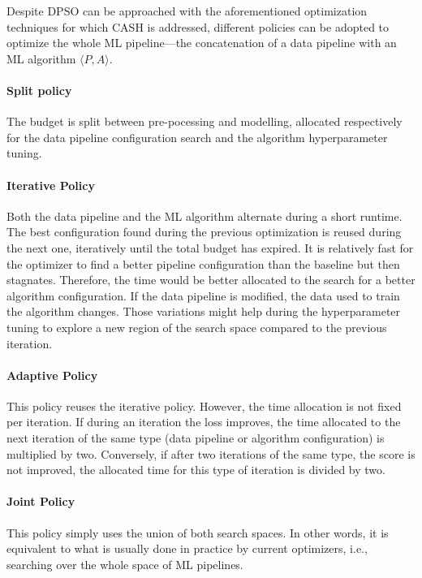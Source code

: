 Despite DPSO can be approached with the aforementioned optimization techniques for which CASH is addressed, different policies can be adopted to optimize the whole ML pipeline---the concatenation of a data pipeline with an ML algorithm $\langle P, A \rangle$.

\paragraph{Split policy}
The budget is split between pre-pocessing and modelling, allocated respectively for the data pipeline configuration search and the algorithm hyperparameter tuning.

\paragraph{Iterative Policy}
Both the data pipeline and the ML algorithm alternate during a short runtime.
The best configuration found during the previous optimization is reused during the next one, iteratively until the total budget has expired.
It is relatively fast for the optimizer to find a better pipeline configuration than the baseline but then stagnates.
Therefore, the time would be better allocated to the search for a better algorithm configuration.
If the data pipeline is modified, the data used to train the algorithm changes.
Those variations might help during the hyperparameter tuning to explore a new region of the search space compared to the previous iteration.

\paragraph{Adaptive Policy}
This policy reuses the iterative policy.
However, the time allocation is not fixed per iteration.
If during an iteration the loss improves, the time allocated to the next iteration of the same type (data pipeline or algorithm configuration) is multiplied by two.
Conversely, if after two iterations of the same type, the score is not improved, the allocated time for this type of iteration is divided by two.

\paragraph{Joint Policy}
This policy simply uses the union of both search spaces.
In other words, it is equivalent to what is usually done in practice by current optimizers, i.e., searching over the whole space of ML pipelines.


